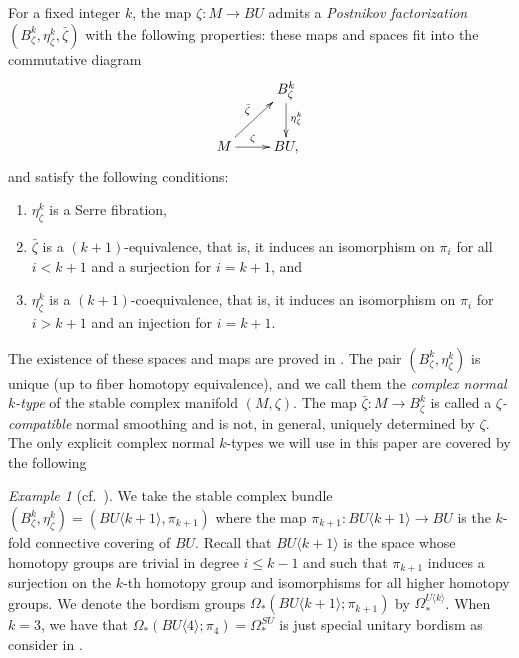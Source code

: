 \documentclass[12pt]{amsart}
\newcommand\scxs{\zeta}					%
\newcommand\bscxs{\bar \zeta}			%
\newcommand{\an}[1]{\langle{#1}{\rangle}}
\theoremstyle{remark}
\newtheorem{Example}[Theorem]{Example}
\begin{document}
For a fixed integer $k$, the map $\zeta \colon M\to BU$ admits a
\emph{Postnikov factorization} $(B^k_{\zeta}, \eta ^k_{\zeta}, \bar
\zeta)$ with the following properties: these maps and spaces fit into
the commutative diagram
%                                                                               
\[ \xymatrix{  & B^k_{\zeta} \ar[d]^{\eta^k_{\zeta}}\\
M \ar[r]^-{\zeta} \ar[ur]^-{\bar \zeta} & BU,} \]
%                                                                               
and satisfy the following conditions:
\begin{enumerate}
\item $\eta^k_{\zeta}$ is a Serre fibration,
\item $\bar \zeta$ is a $(k{+}1)$-equivalence, that is, it induces an
isomorphism on $\pi _i$ for all $i<k{+}1$ and a surjection for $i=k{+}1$,
and
\item $\eta ^k _{\zeta}$ is a $(k{+}1)$-coequivalence, that is, it induces an
isomorphism on $\pi _i $ for $i>k{+}1$ and an injection for $i=k{+}1$.
\end{enumerate}
The existence of these spaces and maps are proved in \cite[Chapters 2 \& 5]{Baues77}.
The pair $(B^k_{\zeta}, \eta ^k _{\zeta})$ is unique (up to fiber
homotopy equivalence),  and we call them the {\em complex normal $k$-type} of the stable
complex manifold $(M,\zeta)$.
The map $\bscxs \colon M \to B^k_\scxs$ is called a {\em $\scxs$-compatible}
normal smoothing and is not, in general, uniquely determined by $\scxs$.
The only explicit complex normal $k$-types we will use in this paper 
are covered by the following

\begin{Example}[cf.~{\cite[Example 2.5]{BCS2}}] \label{exa:normal-type}
We take the stable complex bundle 
$(B^k_\scxs, \eta^k_\scxs) = (BU\an{k{+}1}, \pi_{k{+}1})$ where
the map $\pi_{k{+}1} \colon BU\an{k{+}1} \to BU$ is the $k$-fold
connective covering of $BU$. Recall that $BU\an{k{+}1}$ is the space
whose homotopy groups are trivial in degree $i \le k-1$ and such that
$\pi_{k{+}1}$ induces a surjection on the $k$-th homotopy group and
isomorphisms for all higher homotopy groups.  We denote the bordism
groups $\Omega_*(BU\an{k{+}1}; \pi_{k{+}1})$ by $\Omega_*^{U\an{k}}$. When
$k = 3$, we have  that $\Omega_*(BU\an{4}; \pi_4) = \Omega_*^{SU}$ is just
special unitary bordism as consider in \cite[Chapter X]{Stong1}.
\end{Example}
\end{document}
